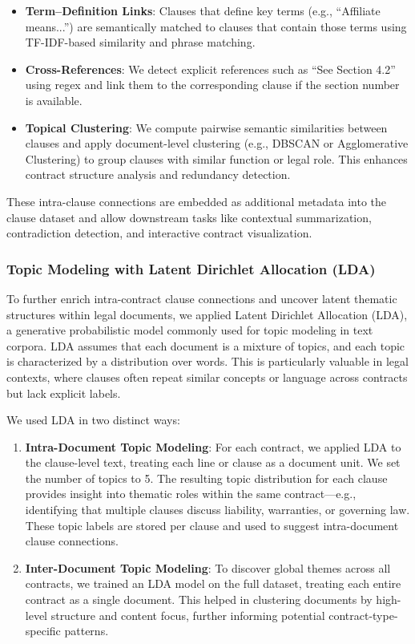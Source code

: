 \documentclass[11pt, oneside]{article}   	%
\begin{document}
\begin{itemize}
    \item \textbf{Term--Definition Links}: Clauses that define key terms (e.g., “Affiliate means...”) are semantically matched to clauses that contain those terms using TF-IDF-based similarity and phrase matching.
    
    \item \textbf{Cross-References}: We detect explicit references such as “See Section 4.2” using regex and link them to the corresponding clause if the section number is available.
    
    \item \textbf{Topical Clustering}: We compute pairwise semantic similarities between clauses and apply document-level clustering (e.g., DBSCAN or Agglomerative Clustering) to group clauses with similar function or legal role. This enhances contract structure analysis and redundancy detection.
\end{itemize}

These intra-clause connections are embedded as additional metadata into the clause dataset and allow downstream tasks like contextual summarization, contradiction detection, and interactive contract visualization.

\subsubsection*{Topic Modeling with Latent Dirichlet Allocation (LDA)}

To further enrich intra-contract clause connections and uncover latent thematic structures within legal documents, we applied Latent Dirichlet Allocation (LDA), a generative probabilistic model commonly used for topic modeling in text corpora. LDA assumes that each document is a mixture of topics, and each topic is characterized by a distribution over words. This is particularly valuable in legal contexts, where clauses often repeat similar concepts or language across contracts but lack explicit labels.

We used LDA in two distinct ways:

\begin{enumerate}
    \item \textbf{Intra-Document Topic Modeling}: For each contract, we applied LDA to the clause-level text, treating each line or clause as a document unit. We set the number of topics to 5. The resulting topic distribution for each clause provides insight into thematic roles within the same contract—e.g., identifying that multiple clauses discuss liability, warranties, or governing law. These topic labels are stored per clause and used to suggest intra-document clause connections.

    \item \textbf{Inter-Document Topic Modeling}: To discover global themes across all contracts, we trained an LDA model on the full dataset, treating each entire contract as a single document. This helped in clustering documents by high-level structure and content focus, further informing potential contract-type-specific patterns.
\end{enumerate}
\end{document}
